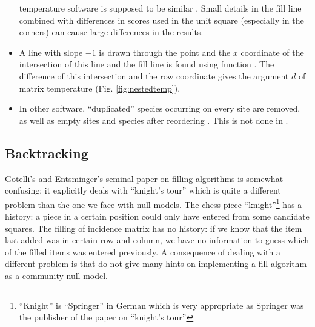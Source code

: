 \documentclass[article,nojss]{jss}
\renewcommand{\cite}{\citep}
\begin{document}
\begin{itemize}
    temperature software \citep{AtmarPat93} is supposed to be similar
    \citep{RodGir06}. Small details in the fill line combined with
    differences in scores used in the unit square (especially in the
    corners) can cause large differences in the results.
  \item A line with slope $-1$ is drawn through the point and the $x$
    coordinate of the intersection of this line and the fill line is
    found using function . The difference of this
    intersection and the row coordinate gives the argument $d$ of matrix
    temperature (Fig. \ref{fig:nestedtemp}).
  \item In other software, ``duplicated'' species occurring on every
    site are removed, as well as empty sites and species after
    reordering \cite{RodGir06}. This is not done in .
\end{itemize}

\subsection{Backtracking}

Gotelli's and Entsminger's seminal paper \cite{GotelliEnt01} on filling
algorithms is somewhat confusing: it explicitly deals with ``knight's
tour'' which is quite a different problem than the one we face with
null models.  The chess piece ``knight''\footnote{``Knight'' is
  ``Springer'' in German which is very appropriate as Springer was the
  publisher of the paper on ``knight's tour''} has a history:
a piece in a certain position could only have entered from some
candidate squares. The filling of incidence matrix has no  history:
if we know that the item last added was in certain row and column, we
have no information to guess which of the filled items was entered
previously. A consequence of dealing with a different problem is that
\citet{GotelliEnt01} do not give many hints on implementing a fill
algorithm as a community null model.
\end{document}
